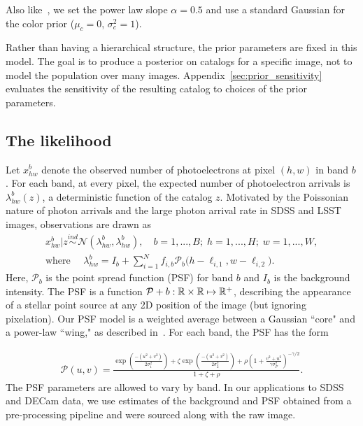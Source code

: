 Also like~\cite{Feder_2019}, we set the power law slope $\alpha = 0.5$ and use a standard Gaussian for the color prior ($\mu_c = 0$, $\sigma^2_c = 1$).

Rather than having a hierarchical structure, 
the prior parameters are fixed in this model. 
The goal is to produce a posterior on catalogs for a
specific image, not to model the population over many images. 
Appendix~\ref{sec:prior_sensitivity} evaluates the
sensitivity of the resulting catalog to choices of the prior parameters.

\subsection{The likelihood}
Let $x_{hw}^b$ denote the observed number of photoelectrons at pixel $(h,w)$ in band $b$.
For each band, at every pixel, the expected number of photoelectron arrivals is $\lambda^b_{hw}(z)$, a deterministic function of the catalog $z$. Motivated by the Poissonian nature of photon arrivals and
the large photon arrival rate in SDSS and LSST images,
observations are drawn as
\begin{align}
  x_{hw}^b | z \overset{ind}{\sim} \mathcal{N}(\lambda^b_{hw}, \lambda^b_{hw}),
  \quad
  b = 1, ..., B; \;
  h = 1,..., H; \;
  w = 1, ..., W, \\
 \text{where } \quad
 \lambda^b_{hw} = I_b + \sum_{i = 1}^N f_{i,b} \mathcal{P}_b\big(h - \ell_{i, 1}, w - \ell_{i, 2}\big).
  \label{eq:expected_intensity}
\end{align}
Here, $\mathcal{P}_b$ is the point spread function (PSF) for band $b$ and $I_b$ is the background intensity.
The PSF is a function
$\mathcal{P}+b : \mathbb{R} \times \mathbb{R} \mapsto \mathbb{R}^+$,
describing the appearance of a stellar point source at any 2D position of the image (but ignoring pixelation).
Our PSF model is a weighted average between a Gaussian ``core" and a power-law ``wing," as described in~\cite{Xin2018psf}. For each band, the PSF has the form

\begin{align}
    \mathcal{P}(u,v) =
    \frac{\exp(\frac{-(u^2 + v^2)}{2\sigma_1^2}) +
    \zeta \exp(\frac{-(u^2 + v^2)}{2\sigma_2^2}) +
    \rho(1 + \frac{v^2 + u^2}{\gamma\sigma^2_P})^{-\gamma/2} }{1 + \zeta + \rho}.
\end{align}
The PSF parameters are allowed to vary by band.
In our applications to SDSS and DECam data, we use estimates of the background
and PSF obtained from a pre-processing pipeline and were
sourced along with the raw image.



